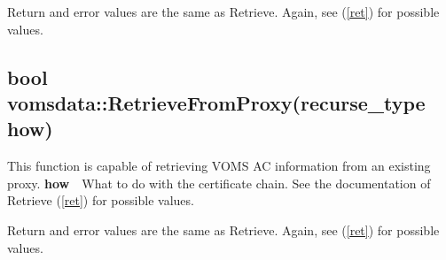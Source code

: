 \documentclass[a4paper]{book}
\newcommand{\parameter}[2]{\newline\textbf{#1}\ \ #2}
\begin{document}
Return and error values are the same as Retrieve.  Again, see
(\ref{ret}) for possible values.


\subsection{bool vomsdata::RetrieveFromProxy(recurse\_type how)}

This function is capable of retrieving VOMS AC information from an
existing proxy.
\parameter{how}{What to do with the certificate chain. See the
documentation of Retrieve (\ref{ret}) for possible values.}

Return and error values are the same as Retrieve.  Again, see
(\ref{ret}) for possible values.
\end{document}
